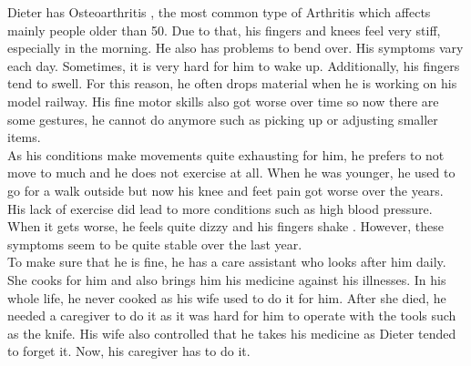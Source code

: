 \documentclass[plainarticle,zihtitle,english,final,hyperref,utf8]{zihpub}
\begin{document}
\newline
Dieter has Osteoarthritis \cite{arthritis}, the most common type of Arthritis which affects mainly people older than 50. Due to that, his fingers and knees feel very stiff, especially in the morning. He also has problems to bend over. His symptoms vary each day. Sometimes, it is very hard for him to wake up. Additionally, his fingers tend to swell. For this reason, he often drops material when he is working on his model railway. His fine motor skills also got worse over time so now there are some gestures, he cannot do anymore such as picking up or adjusting smaller items.\\
\newline
As his conditions make movements quite exhausting for him, he prefers to not move to much and he does not exercise at all. When he was younger, he used to go for a walk outside but now his knee and feet pain got worse over the years.\\
His lack of exercise did lead to more conditions such as high blood pressure. When it gets worse, he feels quite dizzy and his fingers shake \cite{osthoff19}. However, these symptoms seem to be quite stable over the last year.\\
\newline
To make sure that he is fine, he has a care assistant who looks after him daily. She cooks for him and also brings him his medicine against his illnesses. In his whole life, he never cooked as his wife used to do it for him. After she died, he needed a caregiver to do it as it was hard for him to operate with the tools such as the knife. His wife also controlled that he takes his medicine as Dieter tended to forget it. Now, his caregiver has to do it.

\newpage
\end{document}
